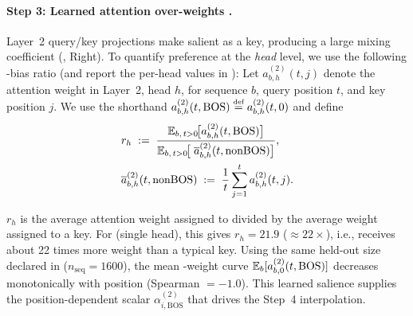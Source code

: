 \documentclass{article}
\theoremstyle{plain}
\theoremstyle{definition}
\theoremstyle{remark}
\begin{document}
\paragraph{Step 3: Learned attention over-weights \bos.}
Layer~2 query/key projections make \bos salient as a key, producing a large \bos mixing coefficient (, Right).
To quantify \bos preference at the \emph{head} level, we use the following \bos-bias ratio (and report the per-head values in ):
Let $a^{(2)}_{b,h}(t,j)$ denote the attention weight in Layer~2, head $h$, for sequence $b$, query position $t$, and key position $j$.
We use the shorthand $a^{(2)}_{b,h}(t,\bos) \defeq a^{(2)}_{b,h}(t,0)$ and define
\begin{align}
\label{eq:bos_attention_metric}
&r_h \;:=\;
\frac{\mathbb{E}_{b,\,t>0}\!\big[a^{(2)}_{b,h}(t,\mathrm{BOS})\big]}
{\mathbb{E}_{b,\,t>0}\!\big[\;\overline{a}^{(2)}_{b,h}(t,\mathrm{nonBOS})\big]},
\\
&\overline{a}^{(2)}_{b,h}(t,\mathrm{nonBOS}) \;:=\; \frac{1}{t}\sum_{j=1}^{t} a^{(2)}_{b,h}(t,j).
\end{align}

$r_h$ is the average attention weight assigned to \bos divided by the average weight assigned to a \nbos key.
For \modelminimal (single head), this gives $r_h=21.9$ ($\approx 22\times$), i.e., \bos receives about 22 times more weight than a typical \nbos key.
Using the same held-out size declared in  ($n_{\text{seq}}=1600$), the mean \bos-weight curve
\(\mathbb{E}_b[a^{(2)}_{b,0}(t,\mathrm{BOS})]\) decreases monotonically with position
(Spearman $=-1.0$).
This learned salience supplies the position-dependent scalar $\alpha^{(2)}_{i,\mathrm{BOS}}$ that drives the Step~4 interpolation.
\end{document}
